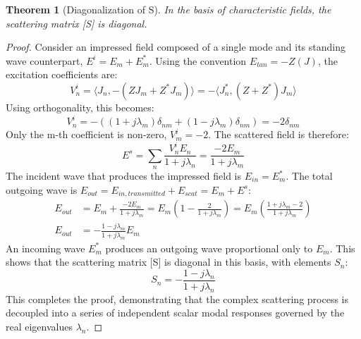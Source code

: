 \documentclass[11pt,a4paper]{article}
\newtheorem{theorem}{Theorem}[section]
\begin{document}
\begin{theorem}[Diagonalization of S]
In the basis of characteristic fields, the scattering matrix [S] is diagonal.
\end{theorem}
\begin{proof}
Consider an impressed field composed of a single mode and its standing wave counterpart, \(E^{i}=E_{m}+E_{m}^{*}\). Using the convention \(E_{tan}=-Z(J)\), the excitation coefficients are:
\begin{equation}
    V_{n}^{i}=\langle J_{n},-(ZJ_{m}+Z^{*}J_{m})\rangle=-\langle J_{n}^{*},(Z+Z^{*})J_{m}\rangle
\end{equation}
Using orthogonality, this becomes:
\begin{equation}
    V_{n}^{i}=-((1+j\lambda_{m})\delta_{nm}+(1-j\lambda_{m})\delta_{nm})=-2\delta_{nm}
\end{equation}
Only the m-th coefficient is non-zero, \(V_{m}^{i}=-2\). The scattered field is therefore:
\begin{equation}
    E^{s}=\sum_{n}\frac{V_{n}^{i}E_{n}}{1+j\lambda_{n}}=\frac{-2E_{m}}{1+j\lambda_{m}}
\end{equation}
The incident wave that produces the impressed field is \(E_{in}=E_{m}^{*}\). The total outgoing wave is \(E_{out}=E_{in,transmitted}+E_{scat}=E_{m}+E^{s}\):
\begin{align}
    E_{out} &= E_{m}+\frac{-2E_{m}}{1+j\lambda_{m}} = E_{m}\left(1-\frac{2}{1+j\lambda_{m}}\right) = E_{m}\left(\frac{1+j\lambda_{m}-2}{1+j\lambda_{m}}\right) \\
    E_{out} &= -\frac{1-j\lambda_{m}}{1+j\lambda_{m}}E_{m}
\end{align}
An incoming wave \(E_{m}^{*}\) produces an outgoing wave proportional only to \(E_{m}\). This shows that the scattering matrix [S] is diagonal in this basis, with elements \(S_{n}\):
\begin{equation}
    S_{n}=-\frac{1-j\lambda_{n}}{1+j\lambda_{n}}
\end{equation}
This completes the proof, demonstrating that the complex scattering process is decoupled into a series of independent scalar modal responses governed by the real eigenvalues \(\lambda_{n}\).
\end{proof}
\end{document}
